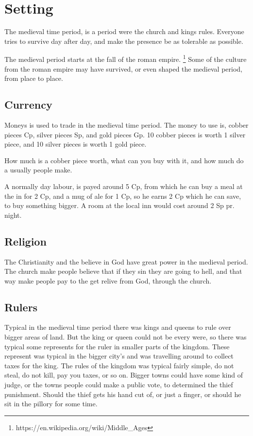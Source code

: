 \chapter{Setting}
The medieval time period, is a period were the church and kings rules.
Everyone tries to survive day after day, and make the presence be as tolerable as possible.

The medieval period starts at the fall of the roman empire. \footnote{https://en.wikipedia.org/wiki/Middle\_Ages}
Some of the culture from the roman empire may have survived, or even shaped the medieval period, from place to place.

\section{Currency}
Moneys is used to trade in the medieval time period. The money to use is, cobber pieces Cp, silver pieces Sp, and gold pieces Gp. 10 cobber pieces is worth 1 silver piece, and 10 silver pieces is worth 1 gold piece.

How much is a cobber piece worth, what can you buy with it, and how much do a usually people make.

A normally day labour, is payed around 5 Cp, from which he can buy a meal at the in for 2 Cp, and a mug of ale for 1 Cp, so he earns 2 Cp which he can save, to buy something bigger.
A room at the local inn would cost around 2 Sp pr. night.

\section{Religion}
The Christianity and the believe in God have great power in the medieval period.
The church make people believe that if they sin they are going to hell, and that way make people pay to the get relive from God, through the church.

\section{Rulers}
Typical in the medieval time period there was kings and queens to rule over bigger areas of land.
But the king or queen could not be every were, so there was typical some represents for the ruler in smaller parts of the kingdom.
These represent was typical in the bigger city's and was travelling around to collect taxes for the king.
The rules of the kingdom was typical fairly simple, do not steal, do not kill, pay you taxes, or so on.
Bigger towns could have some kind of judge, or the towns people could make a public vote, to determined the thief punishment.
Should the thief gets his hand cut of, or just a finger, or should he sit in the pillory for some time.
